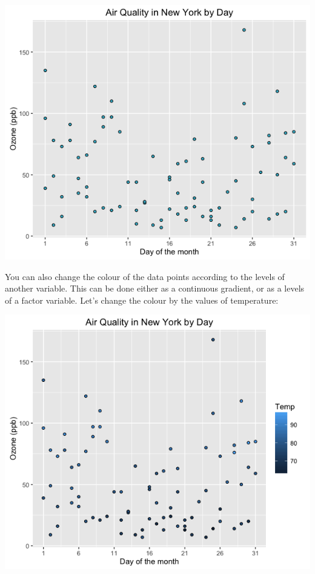 \begin{center}\includegraphics[width=0.55\linewidth]{0_all_posts_pdf/scatter_6-1} \end{center}

You can also change the colour of the data points according to the
levels of another variable. This can be done either as a continuous
gradient, or as a levels of a factor variable. Let's change the colour
by the values of temperature:

\begin{Shaded}
\begin{Highlighting}[]
\StringTok{ }\NormalTok{(}   \StringTok{ }
\StringTok{      }\NormalTok{(} \NormalTok{) +}
\StringTok{      }\NormalTok{(}\NormalTok{) +}\StringTok{ }
\StringTok{      }\NormalTok{(} \NormalTok{, } \NormalTok{) +}
\StringTok{      }\NormalTok{(} \NormalTok{(}\NormalTok{, }\NormalTok{, }\NormalTok{))}
\end{Highlighting}
\end{Shaded}

\begin{center}\includegraphics[width=0.55\linewidth]{0_all_posts_pdf/scatter_7-1} \end{center}

